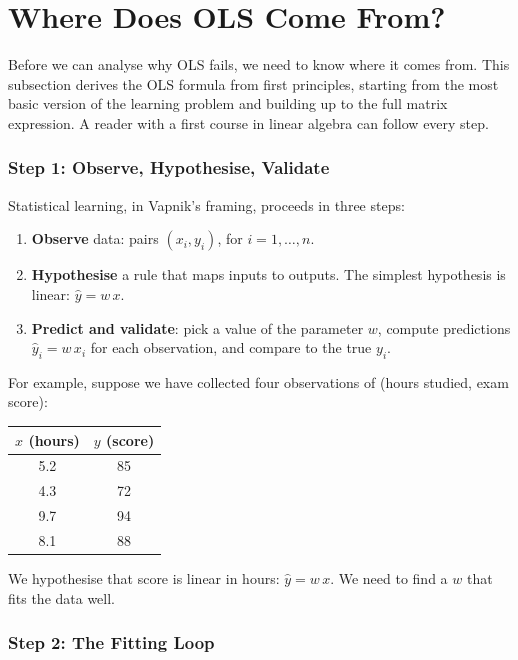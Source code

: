 \documentclass[11pt,a4paper]{article}
\theoremstyle{definition}
\theoremstyle{plain}
\theoremstyle{remark}
\begin{document}
\section{Where Does OLS Come From?}\label{sec:what-ols}

Before we can analyse why OLS fails, we need to know where it comes from. This subsection derives the OLS formula from first principles, starting from the most basic version of the learning problem and building up to the full matrix expression. A reader with a first course in linear algebra can follow every step.

\subsubsection*{Step 1: Observe, Hypothesise, Validate}

Statistical learning, in Vapnik's framing, proceeds in three steps:
\begin{enumerate}[nosep]
  \item \textbf{Observe} data: pairs $(x_i, y_i)$, for $i = 1, \ldots, n$.
  \item \textbf{Hypothesise} a rule that maps inputs to outputs. The simplest hypothesis is linear: $\hat{y} = w\, x$.
  \item \textbf{Predict and validate}: pick a value of the parameter $w$, compute predictions $\hat{y}_i = w\, x_i$ for each observation, and compare to the true $y_i$.
\end{enumerate}

For example, suppose we have collected four observations of (hours studied, exam score):

\begin{center}
\begin{tabular}{@{}cc@{}}
\toprule
$x$ (hours) & $y$ (score) \\
\midrule
5.2 & 85 \\
4.3 & 72 \\
9.7 & 94 \\
8.1 & 88 \\
\bottomrule
\end{tabular}
\end{center}

We hypothesise that score is linear in hours: $\hat{y} = w\, x$. We need to find a $w$ that fits the data well.

\subsubsection*{Step 2: The Fitting Loop}
\end{document}
